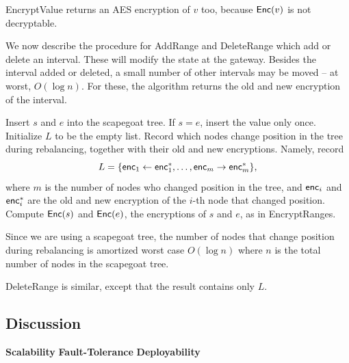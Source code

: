 EncryptValue returns an AES encryption of $v$ too, because $\mathsf{Enc}(v)$ is not decryptable. 

We now describe the procedure for AddRange and DeleteRange which add or delete an interval. 
These will modify the state at the gateway. Besides the interval added or deleted, a small number
of other intervals may be moved -- at worst, $O(\log n)$. For these, the algorithm returns the old and new encryption of the interval. 


\begin{framed}
\begin{algorithmic}[1]

  \State Insert $s$ and $e$ into the scapegoat tree. If $s=e$, insert the value only once.
  \State Initialize $L$ to be the empty list.
  	\State Record which nodes change position in the tree during rebalancing, together with 
	their old and new encryptions. Namely, record	\[L = \{ \mathsf{enc}_1 \leftarrow \mathsf{enc}^*_1, \dots, \mathsf{enc}_m \rightarrow \mathsf{enc}^*_m\},\] where $m$ is the number of nodes who changed position in the tree, and $\mathsf{enc}_i$ and $\mathsf{enc}^*_i$ are the old and new encryption of the $i$-th node that changed position. 
  \EndIf
  \State Compute  $\mathsf{Enc}(s)$ and $\mathsf{Enc}(e)$, the encryptions of $s$ and $e$, as in EncryptRanges.
   \State {}
\EndProcedure

\end{algorithmic}
\end{framed}


Since we are using a scapegoat tree, the number of nodes that change position during rebalancing is amortized worst case $O(\log n)$ where $n$ is the total number of nodes in the scapegoat tree. 

DeleteRange is similar, except that the result contains only $L$. 


\subsection{Discussion}
\label{sec:gwdiscuss}
\textbf{Scalability}
\textbf{Fault-Tolerance}
\textbf{Deployability}
